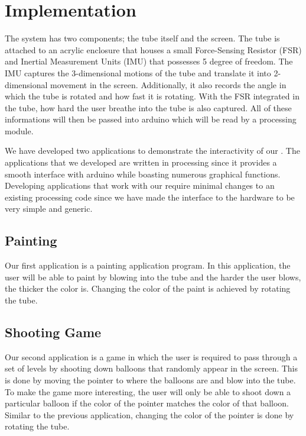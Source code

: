\section{Implementation}

The \tube system has two components; the tube itself and the screen. The tube is attached to an acrylic enclosure that houses a small Force-Sensing Resistor (FSR) and Inertial Measurement Units (IMU) that possesses 5 degree of freedom. The IMU captures the 3-dimensional motions of the tube and translate it into 2-dimensional movement in the screen. Additionally, it also records the angle in which the tube is rotated and how fast it is rotating. With the FSR integrated in the tube, how hard the user breathe into the tube is also captured. All of these informations will then be passed into arduino which will be read by a processing module.

We have developed two applications to demonstrate the interactivity of our \tube. The applications that we developed are written in processing since it provides a smooth interface with arduino while boasting numerous graphical functions. Developing applications that work with our \tube require minimal changes to an existing processing code since we have made the interface to the hardware to be very simple and generic.

\subsection{Painting}
Our first application is a painting application program. In this application, the user will be able to paint by blowing into the tube and the harder the user blows, the thicker the color is. Changing the color of the paint is achieved by rotating the tube.

\subsection{Shooting Game}
Our second application is a game in which the user is required to pass through a set of levels by shooting down balloons that randomly appear in the screen. This is done by moving the pointer to where the balloons are and blow into the tube. To make the game more interesting, the user will only be able to shoot down a particular balloon if the color of the pointer matches the color of that balloon. Similar to the previous application, changing the color of the pointer is done by rotating the tube.
